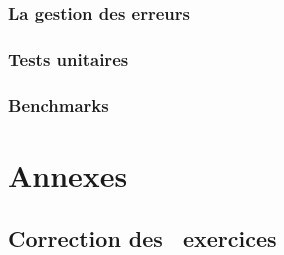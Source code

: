 \documentclass{minitelreport}
\newcounter{exercisescounter}
\begin{document}
\begin{refsection}
		\section{La gestion des erreurs}
			\label{sec:la_gestion_des_erreurs}
			
		\section{Tests unitaires}
			\label{sec:tests_unitaires}
			
		\section{Benchmarks}
			\label{sec:benchmarks}
			
\part{Annexes}
\label{part:annexes}
	\chapter{Correction des \theexercisescounter\ exercices}
	\label{chap:correction_exercices}
		


\printbibheading
\printbibliography[type=book,heading=subbibliography,title={Livres}]
\printbibliography[type=manual, heading=subbibliography, title={Manuels et documentation}]
\printbibliography[type=online, heading=subbibliography, title={Autres liens}]
\end{refsection}
\end{document}
